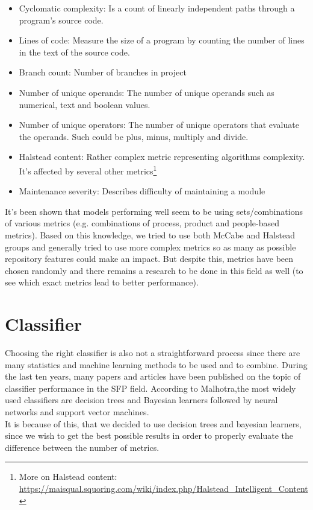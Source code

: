 \begin{itemize}
\item Cyclomatic complexity: Is a count of linearly independent paths through a program's source code. 
\item Lines of code: Measure the size of a program by counting the number of lines in the text of the source code.
\item Branch count: Number of branches in project 
\item Number of unique operands: The number of unique operands such as numerical, text and boolean values.
\item Number of unique operators: The number of unique operators that evaluate the operands. Such could be plus, minus, multiply and divide. 
\item Halstead content: Rather complex metric representing algorithms complexity. It's affected by several other metrics\footnote{More on Halstead content: \url{https://maisqual.squoring.com/wiki/index.php/Halstead_Intelligent_Content}}
\item Maintenance severity: Describes difficulty of maintaining a module
\end{itemize}
It's been shown that models performing well seem to be using sets/combinations of various metrics (e.g. combinations of process, product and people-based metrics)\cite{hall2012systematic}. Based on this knowledge, we tried to use both McCabe and Halstead groups and generally tried to use more complex metrics so as many as possible repository features could make an impact. But despite this, metrics have been chosen randomly and there remains a research to be done in this field as well (to see which exact metrics lead to better performance).
\section{Classifier}
Choosing the right classifier is also not a straightforward process since there are many statistics and machine learning methods to be used and to combine. During the last ten years, many papers and articles have been published on the topic of classifier performance in the SFP field. According to Malhotra\cite{malhotra2015systematic},the most widely used classifiers are decision trees and Bayesian learners followed by neural networks and support vector machines\cite[p.~11]{malhotra2015systematic}.\\
It is because of this, that we decided to use decision trees and bayesian learners, since we wish to get the best possible results in order to properly evaluate the difference between the number of metrics.
